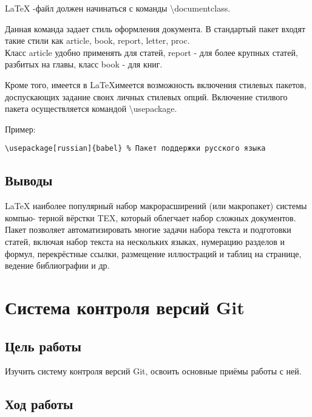 \documentclass[a4paper, 12pt]{article}
\begin{document}
\LaTeX{} -файл должен начинаться с команды \textbackslash documentclass. 

Данная команда задает стиль оформления документа. В стандартый пакет входят такие стили как article, book, report, letter, proc. \\
Класс article удобно применять для статей, report - для более крупных статей, разбитых на главы, класс book - для книг.

Кроме того, имеется в \LaTeX имеется возможность включения стилевых пакетов, доспускающих задание своих личных стилевых опций. Включение стилвого пакета осуществляется командой \textbackslash usepackage.

Пример:

\begin{verbatim}
\usepackage[russian]{babel} % Пакет поддержки русского языка
\end{verbatim}

\subsection{Выводы}

\LaTeX{} наиболее популярный набор макрорасширений (или макропакет) системы компью-
терной вёрстки TEX, который облегчает набор сложных документов.
Пакет позволяет автоматизировать многие задачи набора текста и подготовки статей,
включая набор текста на нескольких языках, нумерацию разделов и формул, перекрёстные
ссылки, размещение иллюстраций и таблиц на странице, ведение библиографии и др.

\newpage
\section{Система контроля версий Git}

\subsection{Цель работы}

Изучить систему контроля версий Git, освоить основные приёмы работы с ней.

\subsection{Ход работы}
\end{document}
